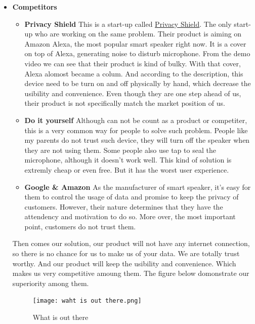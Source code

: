 \documentclass[12pt,twoside]{article}
\begin{document}
\begin{itemize}
\item \textbf{Competitors}\\
\begin{itemize}
    \item \textbf{Privacy Shield} This is a start-up called \href{https://getprivacyshield.co/}{Privacy Shield}. The only start-up who are working on the same problem.
    Their product is aiming on Amazon Alexa, the most popular smart speaker right now. It is a cover on top of Alexa, generating noise to disturb microphone. From the 
    demo video we can see that their product is kind of bulky. With that cover, Alexa alomost became a colum. And according to the description, this device need to be 
    turn on and off physically by hand, which decrease the usibility and convenience. Even though they are one step ahead of us, their product is not specifically match 
    the market position of us.
    \item \textbf{Do it yourself} Although can not be count as a product or competiter, this is a very common way for people to solve such problem. People like my parents
    do not trust such device, they will turn off the speaker when they are not using them. Some people also use tap to seal the microphone, although it doesn't work well.
    This kind of solution is extremly cheap or even free. But it has the worst user experience.
    \item \textbf{Google & Amazon} As the manufacturer of smart speaker, it's easy for them to control the usage of data and promise to keep the privacy of customers. 
    However, their nature determines that they have the attendency and motivation to do so. More over, the most important point, customers do not trust them.
\end{itemize}
Then comes our solution, our product will not have any internet connection, so there is no chance for us to make us of your data. We are totally trust worthy. And our 
product will keep the usibility and convenience. Which makes us very competitive amoung them. The figure below domonstrate our superiority among them.

\begin{figure}[!htb]
\centering
\texttt{[image: waht is out there.png]}
\caption{What is out there}
\label{fig:What is out there}
\end{figure}

\end{itemize}
\end{document}
